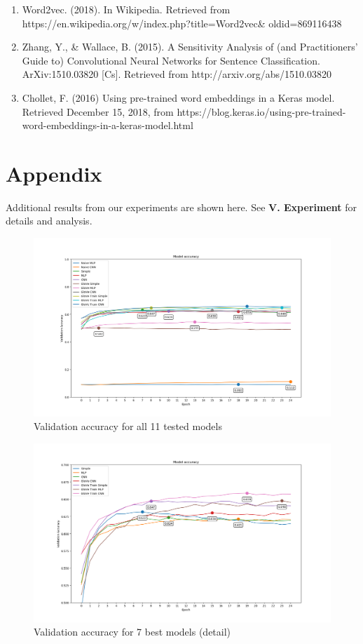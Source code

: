 \documentclass[jou,apacite, 10px]{apa6}
\begin{document}
\begin{enumerate}[(1)]
\item Word2vec. (2018). In Wikipedia. Retrieved from https://en.wikipedia.org/w/index.php?title=Word2vec\& oldid=869116438
\item Zhang, Y., \& Wallace, B. (2015). A Sensitivity Analysis of (and Practitioners’ Guide to) Convolutional Neural Networks for Sentence Classification. ArXiv:1510.03820 [Cs]. Retrieved from http://arxiv.org/abs/1510.03820
\item Chollet, F. (2016) Using pre-trained word embeddings in a Keras model. Retrieved December 15, 2018, from https://blog.keras.io/using-pre-trained-word-embeddings-in-a-keras-model.html
\end{enumerate}

\onecolumn

\section*{Appendix}
Additional results from our experiments are shown here. See \textbf{V. Experiment} for details and analysis.

\begin{figure}[h!]
    \captionsetup{justification=centering}
  \centering
    \includegraphics[width=0.9\columnwidth]{images/all_models_comparison}
  \caption{Validation accuracy for all 11 tested models}
    \label{all_models_comparison}
\end{figure}

\begin{figure}[h!]
    \captionsetup{justification=centering}
    \centering
    \includegraphics[width=0.9\columnwidth]{images/good_models_comparison}
    \caption{Validation accuracy for 7 best models (detail)}
    \label{good_models_comparison_small}
\end{figure}
\end{document}

